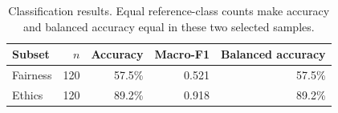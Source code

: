 \begin{table}[H]\centering\small
\begin{tabular}{lrrrr}
\toprule
Subset & $n$ & Accuracy & Macro-F1 & Balanced accuracy\\
\midrule
Fairness & 120 & 57.5\% & 0.521 & 57.5\%\\
Ethics & 120 & 89.2\% & 0.918 & 89.2\%\\
\bottomrule\end{tabular}
\caption{Classification results. Equal reference-class counts make accuracy and balanced accuracy equal in these two selected samples.}
\end{table}
